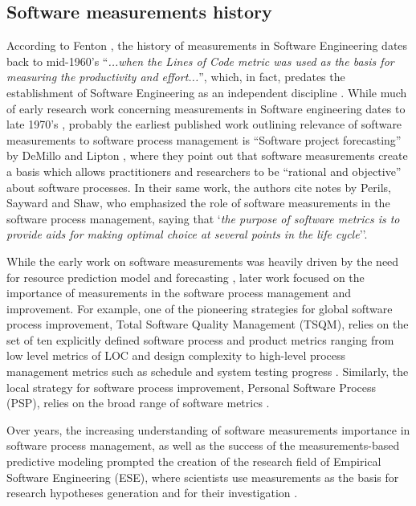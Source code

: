 \subsection{Software measurements history}
According to Fenton \cite{citeulike:1525462}, the history of measurements in Software Engineering dates 
back to mid-1960's  ``\textit{...when the Lines of Code metric was used as the basis for measuring the 
productivity and effort...}'', which, in fact, predates the establishment of Software Engineering as an 
independent discipline \cite{naur_crisis_68}. 
While much of early research work concerning measurements in Software engineering dates to late 1970's 
\cite{citeulike:13158802}, probably the earliest published work outlining relevance of software measurements 
to software process management is ``Software project forecasting'' by DeMillo and Lipton 
\cite{demillo1980software}, where they point out that software measurements create a basis which allows 
practitioners and researchers to be ``rational and objective'' about software processes. 
In their same work, the authors cite notes by Perils, Sayward and Shaw, who emphasized the role of software 
measurements in the software process management, saying that 
`\textit{the purpose of software metrics is to provide aids for making optimal choice at several points 
in the life cycle}''.

While the early work on software measurements was heavily driven by the need for resource prediction model
and forecasting \cite{citeulike:1525462}, later work focused on the importance of measurements in the 
software process management and improvement. For example, one of the pioneering strategies for global software 
process improvement, Total Software Quality Management (TSQM), relies on the set of ten explicitly defined software 
process and product metrics ranging from low level metrics of LOC and design complexity to high-level process 
management metrics such as schedule and system testing progress \cite{citeulike:13071448}.
Similarly, the local strategy for software process improvement, Personal Software Process (PSP), relies on 
the broad range of software metrics \cite{citeulike:13072239}.

Over years, the increasing understanding of software measurements importance in software process management, 
as well as the success of the measurements-based predictive modeling prompted the creation of the research 
field of Empirical Software Engineering (ESE), where scientists use measurements as the basis for research 
hypotheses generation and for their investigation \cite{citeulike:766768}. 


